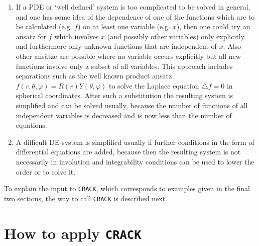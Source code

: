 \begin{enumerate}
\item
  If a PDE or `well defined' system is too complicated to be solved in
  general, and one has some idea of the dependence of one of the
  functions which are to be calculated (e.g. $f$) on at least one
  variable (e.g. $x$), then one could try an ansatz for $f$ which
  involves $x$ (and possibly other variables)
  only explicitly and furthermore only unknown functions
  that are independent of $x$. Also other
  ans\"atze are possible where no variable occurs explicitly but all new
  functions involve only a subset of all variables. This approach
  includes separations such as the well known product ansatz $f(r,
  \theta, \varphi) = R(r)Y(\theta, \varphi)$ to solve the Laplace
  equation $\triangle f = 0$ in spherical coordinates. After such a
  substitution the resulting system is simplified and can be solved
  usually, because the
  number of functions of all independent variables is decreased and is
  now less than the number of equations.

\item
  A difficult DE-system is simplified usually if further conditions
  in the form of differential equations are added,
  because then the resulting system is not necessarily in involution
  and integrability conditions can be used to lower the order or to
  solve it.
\end{enumerate}

To explain the input to {\tt CRACK}, which corresponds to examples
given in the final two sections, the way to call {\tt CRACK} is described next.

\section{How to apply {\tt CRACK}}
